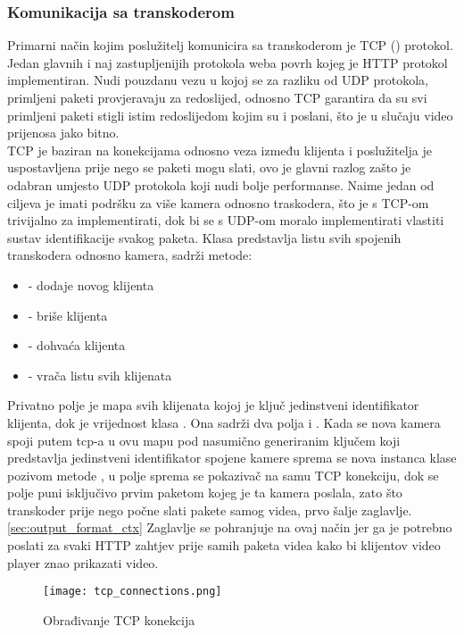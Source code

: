 \subsubsection{Komunikacija sa transkoderom} \label{sec:http}
Primarni način kojim poslužitelj komunicira sa transkoderom je TCP () protokol. \\
Jedan glavnih i naj zastupljenijih protokola weba povrh kojeg je HTTP protokol implementiran. \cite{webProtocols}
\paraBreak
Nudi pouzdanu vezu u kojoj se za razliku od UDP protokola, primljeni paketi provjeravaju za redoslijed, odnosno TCP
garantira da su svi primljeni paketi stigli istim redoslijedom kojim su i poslani, što je u slučaju video prijenosa jako bitno. \\
\paraBreak
TCP je baziran na konekcijama odnosno veza između klijenta i poslužitelja je uspostavljena prije nego se paketi mogu slati, ovo je
glavni razlog zašto je odabran umjesto UDP protokola koji nudi bolje performanse. Naime jedan od ciljeva je imati
podršku za više kamera odnosno traskodera, što je s TCP-om trivijalno za implementirati, dok bi se s UDP-om moralo
implementirati vlastiti sustav identifikacije svakog paketa.
\paraBreak
Klasa  predstavlja listu svih spojenih transkodera odnosno kamera, sadrži metode:
\begin{itemize} \label{sec:sreaming_clients}
  \item {} - dodaje novog klijenta
  \item {} - briše klijenta
  \item {} - dohvaća klijenta
  \item {} - vrača listu svih klijenata
\end{itemize}
Privatno polje  je mapa svih klijenata kojoj je ključ jedinstveni identifikator klijenta, dok
je vrijednost klasa . Ona sadrži dva polja  i .
\paraBreak
Kada se nova kamera spoji putem tcp-a u ovu mapu pod nasumično generiranim ključem koji predstavlja
jedinstveni identifikator spojene kamere sprema se nova instanca klase  pozivom metode
, u polje  sprema se pokazivač na samu TCP konekciju, dok se polje
 puni isključivo prvim paketom kojeg je ta kamera poslala, zato što transkoder prije nego
počne slati pakete samog videa, prvo šalje zaglavlje. \ref{sec:output_format_ctx}
\paraBreak
Zaglavlje se pohranjuje na ovaj način jer ga je potrebno poslati za svaki HTTP zahtjev prije samih paketa videa kako
bi klijentov video player znao prikazati video.
\clearpage
\begin{figure}
  \texttt{[image: tcp\_connections.png]}
  \caption{Obrađivanje TCP konekcija}
\end{figure}

